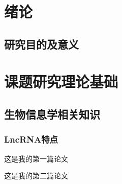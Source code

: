 \section{绪论}
\subsection{研究目的及意义}

\pagebreak

\section{课题研究理论基础}
\subsection{生物信息学相关知识}
\subsubsection{LncRNA特点}

这是我的第一篇论文\cite{xuan_dynamic_2022}

这是我的第二篇论文\cite{10.1093/bib/bbac009}


